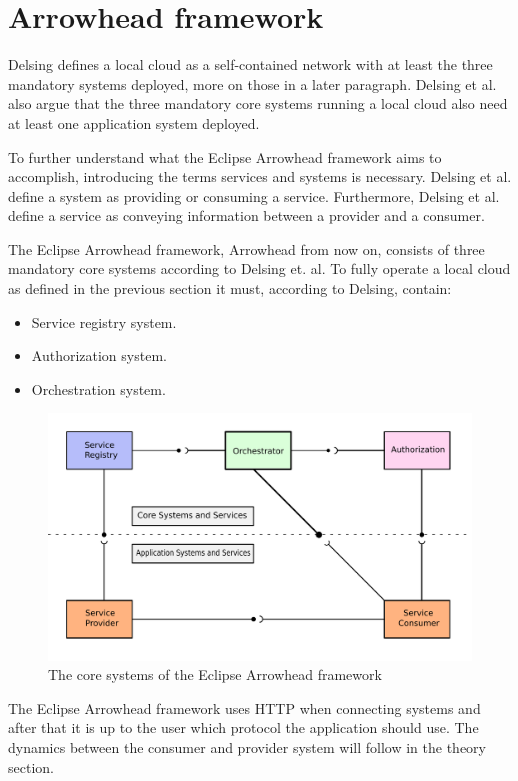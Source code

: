 \section{Arrowhead framework}
Delsing defines a local cloud as a self-contained network with at least the three mandatory systems deployed, more on those in a later paragraph\cite{Delsing2017}. 
Delsing et al. also argue that the three mandatory core systems running a local cloud also need at least one application system deployed.

To further understand what the Eclipse Arrowhead framework aims to accomplish, introducing the terms services and systems is necessary.
Delsing et al. define a system as providing or consuming a service\cite{Delsing2017}.
Furthermore, Delsing et al. define a service as conveying information between a provider and a consumer.

The Eclipse Arrowhead framework, Arrowhead from now on, consists of three mandatory core systems according to Delsing et. al.
To fully operate a local cloud as defined in the previous section it must, according to Delsing, contain:
\begin{itemize}
    \item Service registry system.
    \item Authorization system. 
    \item Orchestration system.\cite{Delsing2017}
\end{itemize} 

\begin{figure}[H]
    \centering
    \includegraphics[width=\textwidth]{Pictures/ah.pdf} 
    \caption{The core systems of the Eclipse Arrowhead framework}
    \label{diagram arrowhead}
\end{figure}
The Eclipse Arrowhead framework uses HTTP when connecting systems and after that it is up to the user which protocol the application should use.
The dynamics between the consumer and provider system will follow in the theory section.
